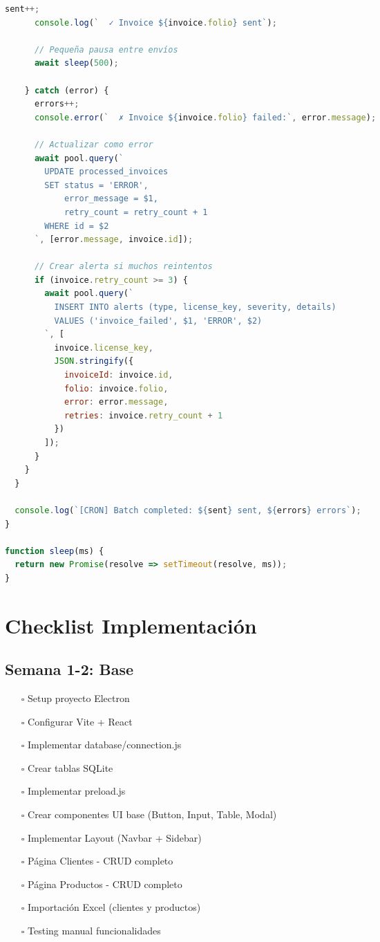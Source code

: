 \documentclass[11pt,a4paper]{article}
\begin{document}
\begin{lstlisting}[language=JavaScript]
      sent++;
      console.log(`  ✓ Invoice ${invoice.folio} sent`);
      
      // Pequeña pausa entre envíos
      await sleep(500);
      
    } catch (error) {
      errors++;
      console.error(`  ✗ Invoice ${invoice.folio} failed:`, error.message);
      
      // Actualizar como error
      await pool.query(`
        UPDATE processed_invoices
        SET status = 'ERROR',
            error_message = $1,
            retry_count = retry_count + 1
        WHERE id = $2
      `, [error.message, invoice.id]);
      
      // Crear alerta si muchos reintentos
      if (invoice.retry_count >= 3) {
        await pool.query(`
          INSERT INTO alerts (type, license_key, severity, details)
          VALUES ('invoice_failed', $1, 'ERROR', $2)
        `, [
          invoice.license_key,
          JSON.stringify({
            invoiceId: invoice.id,
            folio: invoice.folio,
            error: error.message,
            retries: invoice.retry_count + 1
          })
        ]);
      }
    }
  }
  
  console.log(`[CRON] Batch completed: ${sent} sent, ${errors} errors`);
}

function sleep(ms) {
  return new Promise(resolve => setTimeout(resolve, ms));
}
\end{lstlisting}

\newpage

\section{Checklist Implementación}

\subsection{Semana 1-2: Base}

\begin{itemize}
    \item[$\square$] Setup proyecto Electron
    \item[$\square$] Configurar Vite + React
    \item[$\square$] Implementar database/connection.js
    \item[$\square$] Crear tablas SQLite
    \item[$\square$] Implementar preload.js
    \item[$\square$] Crear componentes UI base (Button, Input, Table, Modal)
    \item[$\square$] Implementar Layout (Navbar + Sidebar)
    \item[$\square$] Página Clientes - CRUD completo
    \item[$\square$] Página Productos - CRUD completo
    \item[$\square$] Importación Excel (clientes y productos)
    \item[$\square$] Testing manual funcionalidades
\end{itemize}
\end{document}
